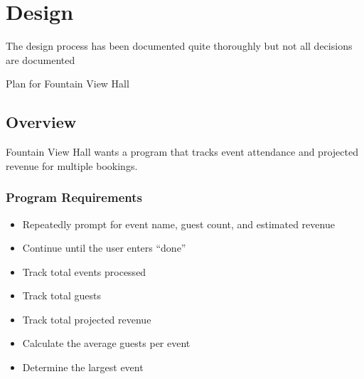 \documentclass[letterpaper,10pt,english]{sphinxmanual}
\begin{document}
\sphinxstepscope


\chapter{Design}
\label{\detokenize{design/index:design}}\label{\detokenize{design/index::doc}}
\sphinxAtStartPar
The design process has been documented quite thoroughly but not all decisions are documented

\sphinxstepscope

\sphinxAtStartPar
Plan for Fountain View Hall


\section{Overview}
\label{\detokenize{design/project-plan:overview}}\label{\detokenize{design/project-plan::doc}}
\sphinxAtStartPar
Fountain View Hall wants a program that tracks event attendance and projected revenue
for multiple bookings.


\subsection{Program Requirements}
\label{\detokenize{design/project-plan:program-requirements}}\begin{itemize}
\item {} 
\sphinxAtStartPar
Repeatedly prompt for event name, guest count, and estimated revenue

\item {} 
\sphinxAtStartPar
Continue until the user enters “done”

\item {} 
\sphinxAtStartPar
Track total events processed

\item {} 
\sphinxAtStartPar
Track total guests

\item {} 
\sphinxAtStartPar
Track total projected revenue

\item {} 
\sphinxAtStartPar
Calculate the average guests per event

\item {} 
\sphinxAtStartPar
Determine the largest event

\end{itemize}
\end{document}
